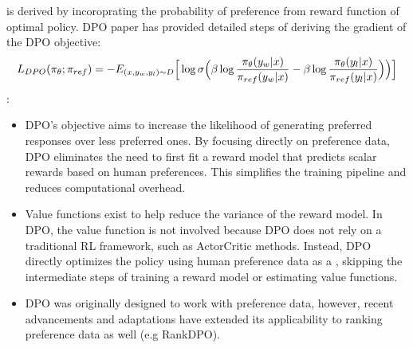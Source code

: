 \documentclass[letterpaper,11pt,english]{sphinxmanual}
\begin{document}
\sphinxAtStartPar
{} is derived by incoroprating the probability
of preference from reward function of optimal policy. DPO paper has
provided detailed steps of deriving the gradient of the DPO objective:
\begin{equation*}
\begin{split}L_{DPO}(\pi_\theta; \pi_{ref}) = -E_{(x,y_w,y_l) \sim D} \Big[\log \sigma \Big(\beta \log {\pi_{\theta}(y_w|x)\over \pi_{ref}(y_w|x)} - \beta \log {\pi_{\theta}(y_l|x)\over \pi_{ref}(y_l|x)}\Big)\Big)\Big]\end{split}
\end{equation*}
\sphinxAtStartPar
{}:
\begin{itemize}
\item {} 
\sphinxAtStartPar
DPO’s objective aims to increase the likelihood of generating
preferred responses over less preferred ones. By focusing directly on
preference data, DPO eliminates the need to first fit a reward model
that predicts scalar rewards based on human preferences. This
simplifies the training pipeline and reduces computational overhead.

\item {} 
\sphinxAtStartPar
Value functions exist to help reduce the variance of the reward model.
In DPO, the value function is not involved because DPO does not rely
on a traditional RL framework, such as Actor\sphinxhyphen{}Critic methods. Instead,
DPO directly optimizes the policy using human preference data as a
, skipping the intermediate steps of training a
reward model or estimating value functions.

\item {} 
\sphinxAtStartPar
DPO was originally designed to work with  preference data,
however, recent advancements and adaptations have extended its
applicability to ranking preference data as well (e.g RankDPO).

\end{itemize}
\end{document}
